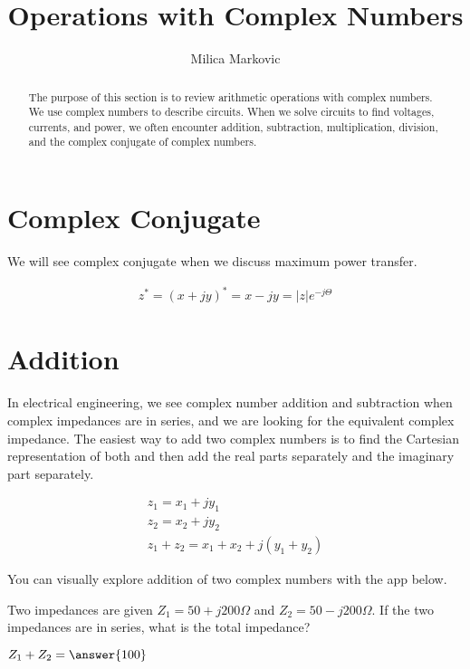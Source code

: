 \documentclass{ximera}
\title{Operations with Complex Numbers}
\author{Milica Markovic}
\begin{document}
  
\begin{abstract}  
The purpose of this section is to review arithmetic operations with complex numbers. We use complex numbers to describe circuits. When we solve circuits to find voltages, currents, and power, we often encounter addition, subtraction, multiplication, division, and the complex conjugate of complex numbers.  
\end{abstract}  
\maketitle    

\section{Complex Conjugate}

 We will see complex conjugate when we discuss maximum power transfer.

\begin{eqnarray}
z^* = (x+ j y)^* = x- j y = |z| e^{-j \Theta}
\end{eqnarray}


\section{Addition}



 In electrical engineering, we see complex number addition and subtraction when complex impedances are in series, and we are looking for the equivalent complex impedance. The easiest way to add two complex numbers is to find the Cartesian representation of both and then add the real parts separately and the imaginary part separately.

\begin{eqnarray}
z_1=x_1 + j y_1 \nonumber \\
z_2=x_2 + j y_2 \nonumber \\
z_1+z_2 = x_1 + x_2 + j ( y_1 + y_2)
\end{eqnarray}


You can visually explore addition of two complex numbers with the app below.
\begin{center}  
\end{center} 



\begin{question}
Two impedances are given $Z_1=50+j200 \Omega$ and  $Z_2=50-j200 \Omega$. If the two impedances are in series, what is the total impedance?
  
$Z_1+Z_2 = \answer{100}$  
\end{question} 
\end{document}

